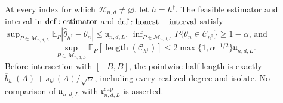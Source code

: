 At every index for which \(\mathcal H_{n,d}\ne\varnothing\), let \(h=h^\dagger\).  The feasible estimator and interval in \({\rm def:estimator}\) and \({\rm def:honest-interval}\) satisfy \(\sup_{P\in\mathcal M_{n,d,L}}\mathbb E_P|\widehat\theta_{h^\dagger}-\theta_n|\le\mathfrak u_{n,d,L}\), \(\inf_{P\in\mathcal M_{n,d,L}}P\{\theta_n\in\mathcal C_{h^\dagger}\}\ge1-\alpha\), and
\[
 \sup_{P\in\mathcal M_{n,d,L}}\mathbb E_P[\operatorname{length}(\mathcal C_{h^\dagger})]
 \le2\max\{1,\alpha^{-1/2}\}\mathfrak u_{n,d,L}.
\]
Before intersection with \([-B,B]\), the pointwise half-length is exactly \(\overline b_{h^\dagger}(A)+\overline s_{h^\dagger}(A)/\sqrt\alpha\), including every realized degree and isolate.  No comparison of \(\mathfrak u_{n,d,L}\) with \(\mathfrak r^{\mathrm{sup}}_{n,d,L}\) is asserted.
